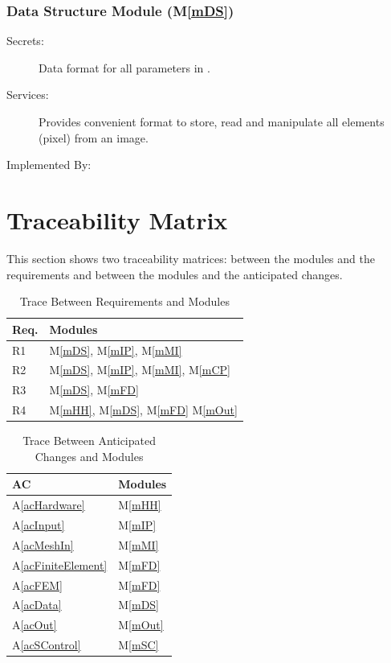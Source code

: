\documentclass[12pt, titlepage]{article}
\newcommand{\mref}[1]{M\ref{#1}}
\begin{document}
	
	
	\subsubsection{Data Structure Module (\mref{mDS})}
	
	\begin{description} \item[Secrets:]Data format for all parameters in
		\progname{}. \item[Services:]Provides convenient format to store, read and
		manipulate all elements (pixel) from an image. \item[Implemented By:]
		\progname{} \end{description}
	
	




	\section{Traceability Matrix} \label{SecTM}
	
	This section shows two traceability matrices: between the modules and the
	requirements and between the modules and the anticipated changes.
	
	\begin{table}[H] \centering \begin{tabular}{p{} p{}}
			\toprule \textbf{Req.} & \textbf{Modules}\\ \midrule R1 & M\ref{mDS},
			M\ref{mIP}, M\ref{mMI}\\ R2 & M\ref{mDS}, M\ref{mIP}, M\ref{mMI}, M\ref{mCP}\\
			R3 & M\ref{mDS}, M\ref{mFD}\\ R4 & M\ref{mHH}, M\ref{mDS}, M\ref{mFD} M\ref{mOut}\\ \bottomrule \end{tabular} \caption{Trace
			Between Requirements and Modules} \label{TblRT} \end{table}
	
	\begin{table}[H] \centering \begin{tabular}{p{} p{}}
			\toprule \textbf{AC} & \textbf{Modules}\\ \midrule A\ref{acHardware} &
			M\ref{mHH}\\ A\ref{acInput} & M\ref{mIP}\\ A\ref{acMeshIn} & M\ref{mMI}\\
			A\ref{acFiniteElement} & M\ref{mFD}\\ A\ref{acFEM} & M\ref{mFD}\\
			A\ref{acData} & M\ref{mDS}\\ A\ref{acOut} & M\ref{mOut}\\ A\ref{acSControl} &
			M\ref{mSC}\\ \bottomrule \end{tabular} \caption{Trace Between Anticipated
			Changes and Modules} \label{TblACT} \end{table}
	
\end{document}
